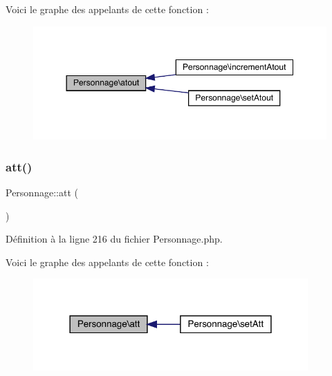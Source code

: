 Voici le graphe des appelants de cette fonction \+:\nopagebreak
\begin{figure}[H]
\begin{center}
\leavevmode
\includegraphics[width=350pt]{class_personnage_a54f0e416a628b1b7246f3c3a7c2081fa_icgraph}
\end{center}
\end{figure}
\mbox{\label{class_personnage_a6d94c6fd714c9e8ef344e386f16c671a}} 
\subsubsection{\texorpdfstring{att()}{att()}}
{\footnotesize\ttfamily Personnage\+::att (\begin{DoxyParamCaption}{ }\end{DoxyParamCaption})}



Définition à la ligne 216 du fichier Personnage.\+php.

Voici le graphe des appelants de cette fonction \+:\nopagebreak
\begin{figure}[H]
\begin{center}
\leavevmode
\includegraphics[width=298pt]{class_personnage_a6d94c6fd714c9e8ef344e386f16c671a_icgraph}
\end{center}
\end{figure}
\mbox{\label{class_personnage_ae91b38c8dfaceca0eda40ae2ea66b99d}} 
